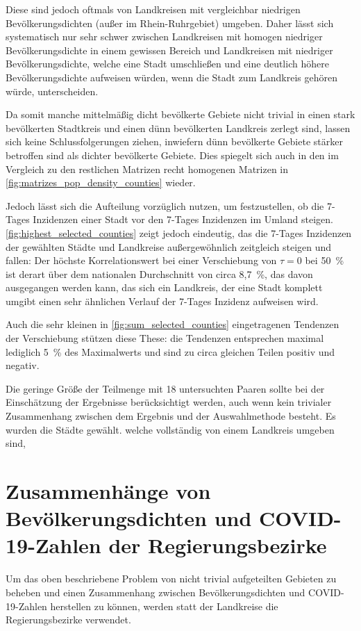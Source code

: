Diese sind jedoch oftmals von Landkreisen mit vergleichbar niedrigen Bevölkerungsdichten (außer im Rhein-Ruhrgebiet) umgeben. Daher lässt sich systematisch nur sehr schwer zwischen Landkreisen mit homogen niedriger Bevölkerungsdichte in einem gewissen Bereich und Landkreisen mit niedriger Bevölkerungsdichte, welche eine Stadt umschließen und eine deutlich höhere Bevölkerungsdichte aufweisen würden, wenn die Stadt zum Landkreis gehören würde, unterscheiden.

Da somit manche mittelmäßig dicht bevölkerte Gebiete nicht trivial in einen stark bevölkerten Stadtkreis und einen dünn bevölkerten Landkreis zerlegt sind, lassen sich keine Schlussfolgerungen ziehen, inwiefern dünn bevölkerte Gebiete stärker betroffen sind als dichter bevölkerte Gebiete. Dies spiegelt sich auch in den im Vergleich zu den restlichen Matrizen recht homogenen Matrizen in \autoref{fig:matrizes_pop_density_counties} wieder.

Jedoch lässt sich die Aufteilung vorzüglich nutzen, um festzustellen, ob die 7-Tages Inzidenzen einer Stadt vor den 7-Tages Inzidenzen im Umland steigen.
\autoref{fig:highest_selected_counties} zeigt jedoch eindeutig, das die 7-Tages Inzidenzen der gewählten Städte und Landkreise außergewöhnlich zeitgleich steigen und fallen: Der höchste Korrelationswert bei einer Verschiebung von $\tau=0$ bei 50~\% ist derart über dem nationalen Durchschnitt von circa 8,7~\%, das davon ausgegangen werden kann, das sich ein Landkreis, der eine Stadt komplett umgibt einen sehr ähnlichen Verlauf der 7-Tages Inzidenz aufweisen wird.

Auch die sehr kleinen in \autoref{fig:sum_selected_counties} eingetragenen Tendenzen der Verschiebung stützen diese These: die Tendenzen entsprechen maximal lediglich 5~\% des Maximalwerts und sind zu circa gleichen Teilen positiv und negativ.

Die geringe Größe der Teilmenge mit 18 untersuchten Paaren sollte bei der Einschätzung der Ergebnisse berücksichtigt werden, auch wenn kein trivialer Zusammenhang zwischen dem Ergebnis und der Auswahlmethode besteht. Es wurden die Städte gewählt. welche vollständig von einem Landkreis umgeben sind,

\section{Zusammenhänge von Bevölkerungsdichten und COVID-19-Zahlen der Regierungsbezirke}\label{sec:discussion:pop_density_districts}
Um das oben beschriebene Problem von nicht trivial aufgeteilten Gebieten zu beheben und einen Zusammenhang zwischen Bevölkerungsdichten und COVID-19-Zahlen herstellen zu können, werden statt der Landkreise die Regierungsbezirke verwendet.

